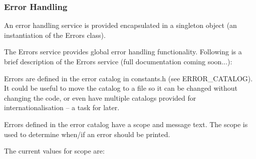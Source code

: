 \subsubsection{Error Handling}\label{sec:ErrorHandling}

An error handling service is provided encapsulated in a singleton object (an instantiation of the Errors class).

The Errors service provides global error handling functionality.  Following is a brief description of the Errors service (full documentation coming soon...):

Errors are defined in the error catalog in constants.h (see ERROR\_CATALOG).  It could be useful to move the catalog to a file so it can be changed without changing the code, or even have multiple catalogs provided for internationalisation -- a task for later.

Errors defined in the error catalog have a scope and message text.  The scope is used to determine when/if an error should be printed.

The current values for scope are:

